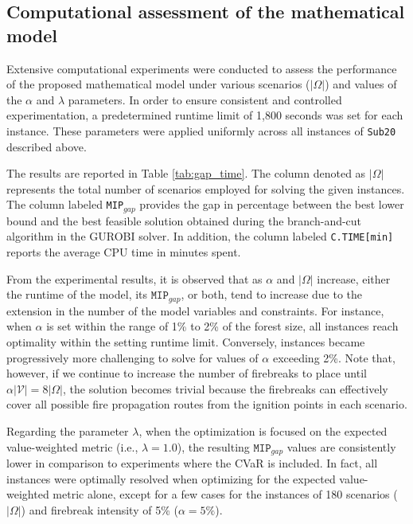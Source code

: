 \documentclass[a4paper,fleqn]{cas-sc}
\begin{document}
\subsection{Computational assessment of the mathematical model}

Extensive computational experiments were conducted to assess the performance of the proposed mathematical model under various scenarios ($|\Omega|$) and values of the $\alpha$ and $\lambda$ parameters. In order to ensure consistent and controlled experimentation, a predetermined runtime limit of 1,800 seconds was set for each instance. These parameters were applied uniformly across all instances of \texttt{Sub20} described above. 

The results are reported in Table \ref{tab:gap_time}. The column denoted as $|\Omega|$ represents the total number of scenarios employed for solving the given instances. The column labeled \texttt{MIP$_{gap}$} provides the gap in percentage between the best lower bound and the best feasible solution obtained during the branch-and-cut algorithm in the GUROBI solver. In addition, the column labeled \texttt{C.TIME[min]} reports the average CPU time in minutes spent. %



From the experimental results, it is observed that as $\alpha$ and $|\Omega|$ increase, either the runtime of the model, its $\texttt{MIP}_{gap}$, or both, tend to increase due to the extension in the number of the model variables and constraints. For instance, when $\alpha$ is set within the range of 1\% to 2\% of the forest size, all instances reach optimality within the setting runtime limit. Conversely, instances became progressively more challenging to solve for values of $\alpha$ exceeding 2\%. Note that, however, if we continue to increase the number of firebreaks to place until $\alpha\lvert \mathcal{V} \rvert = 8|\Omega|$, the solution becomes trivial because the firebreaks can effectively cover all possible fire propagation routes from the ignition points in each scenario.

Regarding the parameter $\lambda$, when the optimization is focused on the expected value-weighted metric (i.e., $\lambda = 1.0$), the resulting $\texttt{MIP}_{gap}$ values are consistently lower in comparison to experiments where the CVaR is included. In fact, all instances were optimally resolved when optimizing for the expected value-weighted metric alone, except for a few cases for the instances of 180 scenarios ($|\Omega|$) and firebreak intensity of 5\% ($\alpha = 5\%$).
\end{document}
